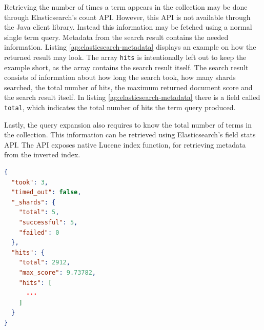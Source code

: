 Retrieving the number of times a term appears in the collection may be done through Elasticsearch's count API.
However, this API is not available through the Java client library.
Instead this information may be fetched using a normal single term query.
Metadata from the search result contains the needed information.
Listing \ref{ap:elasticsearch-metadata} displays an example on how the returned result may look.
The array \texttt{hits} is intentionally left out to keep the example short,
as the array contains the search result itself.
The search result consists of information about how long the search took, how many shards searched, the total number of hits,
the maximum returned document score and the search result itself.
In listing \ref{ap:elasticsearch-metadata} there is a field called \texttt{total},
which indicates the total number of hits the term query produced.

Lastly, the query expansion also requires to know the total number of terms in the collection.
This information can be retrieved using Elasticsearch's field stats API.
The API exposes native Lucene index function,
for retrieving metadata from the inverted index.

\begin{lstlisting}[language={json}, caption={Example of the metadata returned by Elasticsearch.}, label={ap:elasticsearch-metadata}]
{
  "took": 3,
  "timed_out": false,
  "_shards": {
    "total": 5,
    "successful": 5,
    "failed": 0
  },
  "hits": {
    "total": 2912,
    "max_score": 9.73782,
    "hits": [
      ...
    ]
  }
}
\end{lstlisting}
